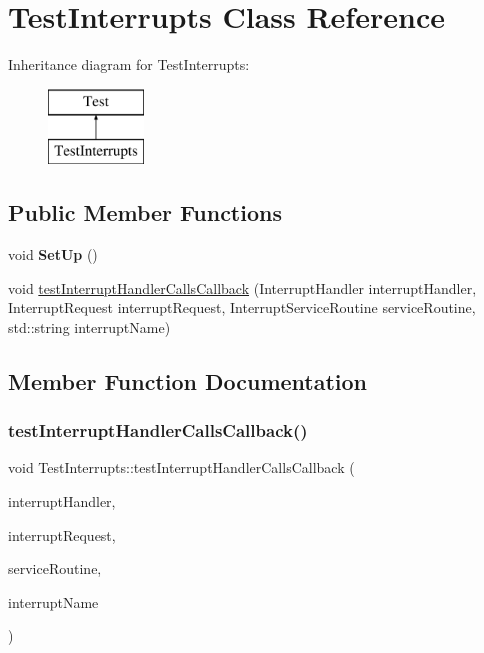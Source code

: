 \hypertarget{class_test_interrupts}{}\section{Test\+Interrupts Class Reference}
\label{class_test_interrupts}
Inheritance diagram for Test\+Interrupts\+:\begin{figure}[H]
\begin{center}
\leavevmode
\includegraphics[height=2.000000cm]{class_test_interrupts}
\end{center}
\end{figure}
\subsection*{Public Member Functions}
\begin{DoxyCompactItemize}
\item 
\mbox{\label{class_test_interrupts_a21921f75ea496b1bfdc5e4ed6d335db8}} 
void {\bfseries Set\+Up} ()
\item 
void \mbox{\hyperlink{class_test_interrupts_ab6080c1aab065f65cf6c7c6e4fd271a0}{test\+Interrupt\+Handler\+Calls\+Callback}} (Interrupt\+Handler interrupt\+Handler, Interrupt\+Request interrupt\+Request, Interrupt\+Service\+Routine service\+Routine, std\+::string interrupt\+Name)
\end{DoxyCompactItemize}


\subsection{Member Function Documentation}
\mbox{\label{class_test_interrupts_ab6080c1aab065f65cf6c7c6e4fd271a0}} 
\subsubsection{\texorpdfstring{test\+Interrupt\+Handler\+Calls\+Callback()}{testInterruptHandlerCallsCallback()}}
{\footnotesize\ttfamily void Test\+Interrupts\+::test\+Interrupt\+Handler\+Calls\+Callback (\begin{DoxyParamCaption}\item[{Interrupt\+Handler}]{interrupt\+Handler,  }\item[{Interrupt\+Request}]{interrupt\+Request,  }\item[{Interrupt\+Service\+Routine}]{service\+Routine,  }\item[{std\+::string}]{interrupt\+Name }\end{DoxyParamCaption})\hspace{0.3cm}{\ttfamily [inline]}}

